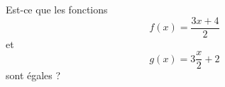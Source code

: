 
\begin{exercice}\label{exosmath-0004}

    Est-ce que les fonctions 
    \begin{equation}
        f(x)=\frac{ 3x+4 }{2}
    \end{equation}
    et
    \begin{equation}
        g(x)=3\frac{ x }{2}+2
    \end{equation}
    sont égales ?

\end{exercice}
